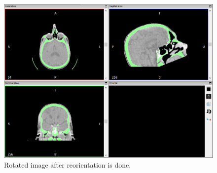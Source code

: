 \begin{figure}[!htb]
\centering
\includegraphics[scale=0.4]{../user_guide_figures/invesalius_screen/image_reorient_rotated_applied_en.png}
\caption{Rotated image after reorientation is done.}
\label{fig:image_reorient_rotated_applied}
\end{figure}
